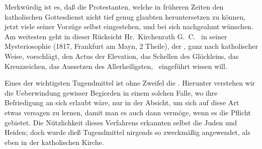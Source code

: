 \begin{RWanm} 
Merkwürdig ist es, daß die Protestanten, welche in früheren Zeiten den katholischen Gottesdienst nicht tief genug glaubten heruntersetzen zu können, jetzt viele seiner Vorzüge selbst eingestehen, und bei sich nachgeahmt wünschen. Am weitesten geht in dieser Rücksicht Hr.\ Kirchenrath G.~C.~ in seiner Mysteriosophie (1817, Frankfurt am Mayn, 2 Theile), der , ganz nach katholischer Weise, vorschlägt, den Actus der Elevation, das Schellen des Glöckleins, das Kreuzzeichen, das Aussetzen des Allerheiligsten, \usw\ eingeführt wissen will. 
\end{RWanm}

Eines der wichtigsten Tugendmittel ist ohne Zweifel die . Hierunter verstehen wir die Ueberwindung gewisser Begierden in einem solchen Falle, wo ihre Befriedigung an sich erlaubt wäre, nur in der Absicht, um sich auf diese Art etwas versagen zu lernen, damit man es auch dann vermöge, wenn es die Pflicht gebietet. Die Nützlichkeit dieses Verfahrens erkannten selbst die Juden und Heiden; doch wurde dieß Tugendmittel nirgends so zweckmäßig angewendet, als eben in der katholischen Kirche.
